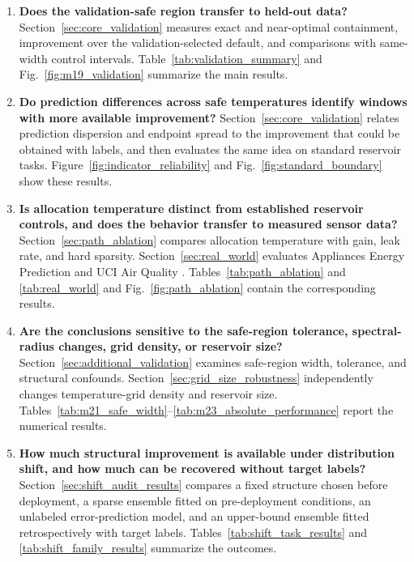 \documentclass[preprint,12pt,authoryear]{elsarticle}
\begin{document}
\begin{enumerate}[leftmargin=*]
\item \textbf{Does the validation-safe region transfer to held-out data?} Section~\ref{sec:core_validation} measures exact and near-optimal containment, improvement over the validation-selected default, and comparisons with same-width control intervals. Table~\ref{tab:validation_summary} and Fig.~\ref{fig:m19_validation} summarize the main results.

\item \textbf{Do prediction differences across safe temperatures identify windows with more available improvement?} Section~\ref{sec:core_validation} relates prediction dispersion and endpoint spread to the improvement that could be obtained with labels, and then evaluates the same idea on standard reservoir tasks. Figure~\ref{fig:indicator_reliability} and Fig.~\ref{fig:standard_boundary} show these results.

\item \textbf{Is allocation temperature distinct from established reservoir controls, and does the behavior transfer to measured sensor data?} Section~\ref{sec:path_ablation} compares allocation temperature with gain, leak rate, and hard sparsity. Section~\ref{sec:real_world} evaluates Appliances Energy Prediction and UCI Air Quality \citep{candanedo2017accurate,devito2008field}. Tables~\ref{tab:path_ablation} and \ref{tab:real_world} and Fig.~\ref{fig:path_ablation} contain the corresponding results.

\item \textbf{Are the conclusions sensitive to the safe-region tolerance, spectral-radius changes, grid density, or reservoir size?} Section~\ref{sec:additional_validation} examines safe-region width, tolerance, and structural confounds. Section~\ref{sec:grid_size_robustness} independently changes temperature-grid density and reservoir size. Tables~\ref{tab:m21_safe_width}--\ref{tab:m23_absolute_performance} report the numerical results.

\item \textbf{How much structural improvement is available under distribution shift, and how much can be recovered without target labels?} Section~\ref{sec:shift_audit_results} compares a fixed structure chosen before deployment, a sparse ensemble fitted on pre-deployment conditions, an unlabeled error-prediction model, and an upper-bound ensemble fitted retrospectively with target labels. Tables~\ref{tab:shift_task_results} and \ref{tab:shift_family_results} summarize the outcomes.
\end{enumerate}
\end{document}
